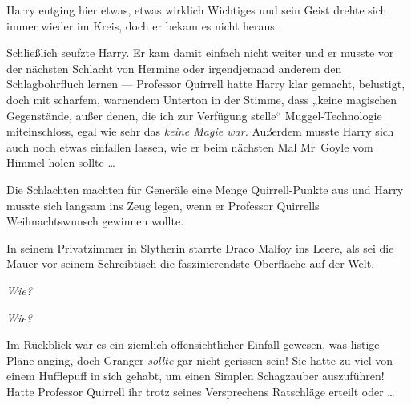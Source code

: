 Harry entging hier etwas, etwas wirklich Wichtiges und sein Geist drehte sich immer wieder im Kreis, doch er bekam es nicht heraus.

Schließlich seufzte Harry. Er kam damit einfach nicht weiter und er musste vor der nächsten Schlacht von Hermine oder irgendjemand anderem den Schlagbohrfluch lernen — Professor Quirrell hatte Harry klar gemacht, belustigt, doch mit scharfem, warnendem Unterton in der Stimme, dass „keine magischen Gegenstände, außer denen, die ich zur Verfügung stelle“ Muggel-Technologie miteinschloss, egal wie sehr das \emph{keine Magie war.} Außerdem musste Harry sich auch noch etwas einfallen lassen, wie er beim nächsten Mal Mr~Goyle vom Himmel holen sollte … %

Die Schlachten machten für Generäle eine Menge Quirrell-Punkte aus und Harry musste sich langsam ins Zeug legen, wenn er Professor Quirrells Weihnachtswunsch gewinnen wollte.

\later

In seinem Privatzimmer in Slytherin starrte Draco Malfoy ins Leere, als sei die Mauer vor seinem Schreibtisch die faszinierendste Oberfläche auf der Welt.

\emph{Wie?}

\emph{Wie?}

Im Rückblick war es ein ziemlich offensichtlicher Einfall gewesen, was listige Pläne anging, doch Granger \emph{sollte} gar nicht gerissen sein! Sie hatte zu viel von einem Hufflepuff in sich gehabt, um einen Simplen Schagzauber auszuführen! Hatte Professor Quirrell ihr trotz seines Versprechens Ratschläge erteilt oder …

